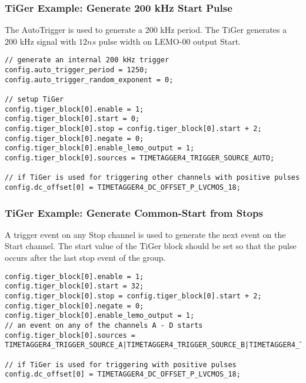 \subsubsection{TiGer Example: Generate 200 kHz Start Pulse}
The AutoTrigger is used to generate a 200 kHz period. The TiGer generates a 200 kHz signal with $12 ns$ pulse width on LEMO-00 output Start.
\begin{lstlisting}[frame=tlrb]
// generate an internal 200 kHz trigger
config.auto_trigger_period = 1250;
config.auto_trigger_random_exponent = 0;

// setup TiGer
config.tiger_block[0].enable = 1;
config.tiger_block[0].start = 0;
config.tiger_block[0].stop = config.tiger_block[0].start + 2;
config.tiger_block[0].negate = 0;
config.tiger_block[0].enable_lemo_output = 1;
config.tiger_block[0].sources = TIMETAGGER4_TRIGGER_SOURCE_AUTO;

// if TiGer is used for triggering other channels with positive pulses
config.dc_offset[0] = TIMETAGGER4_DC_OFFSET_P_LVCMOS_18; 
\end{lstlisting}

\subsubsection{TiGer Example: Generate Common-Start from Stops}
A trigger event on any Stop channel is used to generate the next event on the Start channel. 
The start value of the TiGer block should be set so that the pulse occurs after the last stop event of the group.
\begin{lstlisting}[frame=tlrb]
config.tiger_block[0].enable = 1;
config.tiger_block[0].start = 32;
config.tiger_block[0].stop = config.tiger_block[0].start + 2;
config.tiger_block[0].negate = 0;
config.tiger_block[0].enable_lemo_output = 1;
// an event on any of the channels A - D starts 
config.tiger_block[0].sources = TIMETAGGER4_TRIGGER_SOURCE_A|TIMETAGGER4_TRIGGER_SOURCE_B|TIMETAGGER4_TRIGGER_SOURCE_C|TIMETAGGER4_TRIGGER_SOURCE_D;

// if TiGer is used for triggering with positive pulses
config.dc_offset[0] = TIMETAGGER4_DC_OFFSET_P_LVCMOS_18; 
\end{lstlisting}
